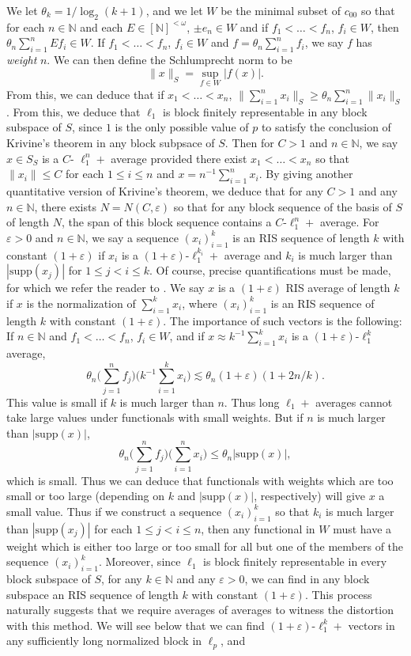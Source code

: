 \documentclass[12pt]{amsart}
\theoremstyle{definition}
\newcommand{\fin}{[\mathbb{N}]^{<\omega}}
\newcommand{\nn}{\mathbb{N}}
\newcommand{\supp}{\mathrm{supp}}
\begin{document}
We let $\theta_k=1/\log_2(k+1)$, and we let $W$ be the minimal subset of $c_{00}$ so that for each $n\in \nn$ and each $E\in \fin$, $\pm e_n\in W$ and if $f_1<\ldots< f_n$, $f_i\in W$, then $\theta_n\sum_{i=1}^n E f_i\in W$.  If $f_1<\ldots <f_n$, $f_i\in W$ and $f=\theta_n\sum_{i=1}^n f_i$, we say $f$ has \emph{weight} $n$.  We can then define the Schlumprecht norm to be $$\|x\|_S=\sup_{f\in W}|f(x)|.$$  From this, we can deduce that if $x_1<\ldots<x_n$, $\|\sum_{i=1}^n x_i\|_S \geqslant \theta_n\sum_{i=1}^n \|x_i\|_S$.  From this, we deduce that $\ell_1$ is block finitely representable in any block subspace of $S$, since $1$ is the only possible value of $p$ to satisfy the conclusion of Krivine's theorem in any block subpsace of $S$.   Then for $C>1$ and $n\in \nn$, we say $x\in S_S$ is a $C$- $\ell_1^n+$ average provided there exist $x_1<\ldots <x_n$ so that $\|x_i\|\leqslant C$ for each $1\leqslant i\leqslant n$ and $x=n^{-1}\sum_{i=1}^n x_i$. By giving another quantitative version of Krivine's theorem, we deduce that for any $C>1$ and any $n\in \nn$, there exists $N=N(C,\varepsilon)$ so that for any block sequence of the basis of $S$ of length $N$, the span of this block sequence contains a $C$-$\ell_1^n+$ average.  For $\varepsilon>0$ and $n\in \nn$, we say a sequence $(x_i)_{i=1}^k$ is an RIS sequence of length $k$ with constant $(1+\varepsilon)$ if $x_i$ is a $(1+\varepsilon)$-$\ell_1^{k_i}+$ average and $k_i$ is much larger than $|\supp(x_j)|$ for $1\leqslant j<i\leqslant k$. Of course, precise quantifications must be made, for which we refer the reader to \cite{OS}. We say $x$ is a $(1+\varepsilon)$ RIS average of length $k$ if $x$ is the normalization of $\sum_{i=1}^k x_i$, where $(x_i)_{i=1}^k$ is an RIS sequence of length $k$ with constant $(1+\varepsilon)$.  The importance of such vectors is the following: If $n\in \nn$ and $f_1<\ldots <f_n$, $f_i\in W$, and if $x\approx k^{-1}\sum_{i=1}^k x_i$ is a $(1+\varepsilon)$-$\ell_1^k$ average, $$\theta_n\bigl(\sum_{j=1}^nf_j\bigr)\bigl(k^{-1}\sum_{i=1}^k x_i\bigr) \lesssim \theta_n(1+\varepsilon)(1+2n/k).$$  This value is small if $k$ is much larger than $n$.  Thus long $\ell_1+$ averages cannot take large values under functionals with small weights.  But if $n$ is much larger than $|\supp(x)|$, $$\theta_n\bigl(\sum_{j=1}^n f_j\bigr)\bigl(\sum_{i=1}^n x_i\bigr)\leqslant \theta_n|\supp(x)|,$$ which is small.  Thus we can deduce that functionals with weights which are too small or too large (depending on $k$ and $|\supp(x)|$, respectively) will give $x$ a small value.  Thus if we construct a sequence $(x_i)_{i=1}^k$ so that $k_i$ is much larger than $ | \supp(x_j)|$ for each $1\leqslant j<i\leqslant n$, then any functional in $W$ must have a weight which is either too large or too small for all but one of the members of the sequence $(x_i)_{i=1}^k$. Moreover, since $\ell_1$ is block finitely representable in every block subspace of $S$, for any $k\in \nn$ and any $\varepsilon>0$, we can find in any block subspace an RIS sequence of length $k$ with constant $(1+\varepsilon)$.  This process naturally suggests that we require averages of averages to witness the distortion with this method.  We will see below that we can find $(1+\varepsilon)$-$\ell_1^k+$ vectors in any sufficiently long normalized block in $\ell_p$, and 
\end{document}

